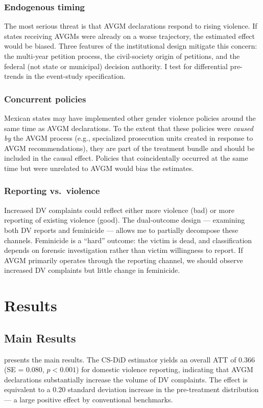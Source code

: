 \documentclass[12pt]{article}
\begin{document}
\subsubsection*{Endogenous timing} The most serious threat is that AVGM declarations respond to rising violence. If states receiving AVGMs were already on a worse trajectory, the estimated effect would be biased. Three features of the institutional design mitigate this concern: the multi-year petition process, the civil-society origin of petitions, and the federal (not state or municipal) decision authority. I test for differential pre-trends in the event-study specification.

\subsubsection*{Concurrent policies} Mexican states may have implemented other gender violence policies around the same time as AVGM declarations. To the extent that these policies were \textit{caused by} the AVGM process (e.g., specialized prosecution units created in response to AVGM recommendations), they are part of the treatment bundle and should be included in the causal effect. Policies that coincidentally occurred at the same time but were unrelated to AVGM would bias the estimates.

\subsubsection*{Reporting vs.\ violence} Increased DV complaints could reflect either more violence (bad) or more reporting of existing violence (good). The dual-outcome design --- examining both DV reports and feminicide --- allows me to partially decompose these channels. Feminicide is a ``hard'' outcome: the victim is dead, and classification depends on forensic investigation rather than victim willingness to report. If AVGM primarily operates through the reporting channel, we should observe increased DV complaints but little change in feminicide.


\section{Results}

\subsection{Main Results}

 presents the main results. The CS-DiD estimator yields an overall ATT of 0.366 (SE = 0.080, $p < 0.001$) for domestic violence reporting, indicating that AVGM declarations substantially increase the volume of DV complaints. The effect is equivalent to a 0.20 standard deviation increase in the pre-treatment distribution --- a large positive effect by conventional benchmarks.
\end{document}
